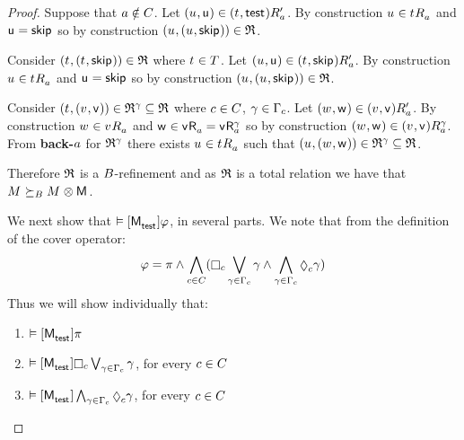 \begin{proof}
Suppose that $a \notin C$.
Let $(\kStateU, \aStateU) \in \kSuccessorsPA{(\kStateT, \aStateTest)}$.
By construction $\kStateU \in \kSuccessorsA{\kStateT}$ and $\aStateU = \aStateSkip$ so by construction $(\kStateU, (\kStateU, \aStateSkip)) \in \refinement$.

Consider $(\kStateT, (\kStateT, \aStateSkip)) \in \refinement$ where $\kStateT \in \kStatesT$.
Let $(\kStateU, \aStateU) \in \kSuccessorsPA{(\kStateT, \aStateSkip)}$.
By construction $\kStateU \in \kSuccessorsA{\kStateT}$ and $\aStateU = \aStateSkip$ so by construction $(\kStateU, (\kStateU, \aStateSkip)) \in \refinement$.

Consider $(\kStateT, (\kStateV, \aStateV)) \in \refinement^\gamma \subseteq \refinement$ where $c \in C$, $\gamma \in \Gamma_c$.
Let $(\kStateW, \aStateW) \in \kSuccessorsPA{(\kStateV, \aStateV)}$.
By construction $\kStateW \in \kSuccessorsA{\kStateV}$ and $\aStateW \in \aSuccessorsA{\aStateV} = \aSuccessorsA[\gamma]{\aStateV}$ so by construction $(\kStateW, \aStateW) \in \kSuccessorsA[\gamma]{(\kStateV, \aStateV)}$.
From {\bf back-$a$} for $\mathfrak{R}^\gamma$ there exists $\kStateU \in \kSuccessorsA{\kStateT}$ such that $(\kStateU, (\kStateW, \aStateW)) \in \refinement^\gamma \subseteq \refinement$.

Therefore $\mathfrak{R}$ is a $B$-refinement and as $\mathfrak{R}$ is a total relation we have that $\kModel \simulatesBs \kModel \exec \aModel$.

We next show that $\entails \actionA{\aPModel{\aStateTest}} \phi$, in several parts.
We note that from the definition of the cover operator:
$$
\phi = \pi \land \bigwedge_{\agentC \in \agentsC} (\necessaryC \bigvee_{\gamma \in \Gamma_\agentC} \gamma \land \bigwedge_{\gamma \in \Gamma_\agentC} \possibleC \gamma)
$$
Thus we will show individually that:
\begin{enumerate}
\item $\entails \actionA{\aPModel{\aStateTest}} \pi$
\item $\entails \actionA{\aPModel{\aStateTest}} \necessaryC \bigvee_{\gamma \in \Gamma_\agentC} \gamma$, for every $c \in C$
\item $\entails \actionA{\aPModel{\aStateTest}} \bigwedge_{\gamma \in \Gamma_\agentC} \possibleC \gamma$, for every $c \in C$
\end{enumerate}


\end{proof}
